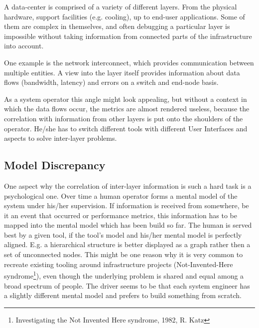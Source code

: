 A data-center is comprised of a variety of different layers. From the physical hardware, support facilities (e.g. cooling), up to end-user applications.
Some of them are complex in themselves, and often debugging a particular layer is impossible without taking information from connected parts
of the infrastructure into account.

One example is the network interconnect, which provides communication between multiple entities.
A view into the layer itself provides information about data flows (bandwidth, latency) and errors on a switch and end-node basis.

As a system operator this angle might look appealing, but without a context in which the data flows occur, the metrics are almost rendered useless,
because the correlation with information from other layers is put onto the shoulders of the operator.
He/she has to switch different tools with different User Interfaces and aspects to solve inter-layer problems.
\subsection{Model Discrepancy}
One aspect why the correlation of inter-layer information is such a hard task is a psychological one. Over time a human operator forms a mental model
of the system under his/her supervision. If information is received from somewhere, be it an event that occurred or performance metrics, this information
has to be mapped into the mental model which has been build so far.
The human is served best by a given tool, if the tool's model and his/her mental model is perfectly aligned.
E.g. a hierarchical structure is better displayed as a graph rather then a set of unconnected nodes.
This might be one reason why it is very common to recreate existing tooling around infrastructure projects
(Not-Invented-Here syndrome\footnote{Investigating the Not Invented Here syndrome, 1982, R. Katz}), even though the underlying problem
is shared and equal among a broad spectrum of people. The driver seems to be that each system engineer has a slightly different mental
model and prefers to build something from scratch.


